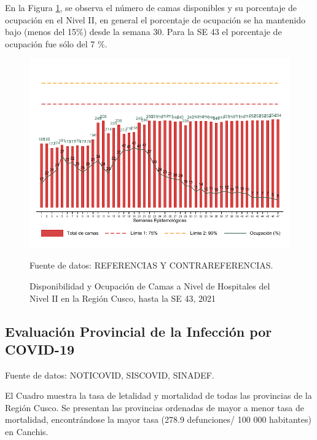 \documentclass[12pt,a4paper,openany]{book}
\begin{document}
En la Figura \ref{fig:ocupacion_2nivel}, se observa el número de camas disponibles y su porcentaje de ocupación en el Nivel II, en general el porcentaje de ocupación se ha mantenido bajo (menos del 15$\%$) desde la semana 30. Para la SE 43 el porcentaje de ocupación fue sólo del 7 $\%$. 

\begin{figure}[h]
	\caption{Disponibilidad y Ocupación de Camas a Nivel de Hospitales del Nivel II en la Región Cusco, hasta la SE 43, 2021}\label{fig:ocupacion_2nivel}
	\begin{center}
		\includegraphics[width=0.85\linewidth]{../figuras/nivel_2.pdf}
	\end{center}
	{\footnotesize {Fuente de datos: REFERENCIAS Y CONTRAREFERENCIAS.}}
\end{figure}
\clearpage
\begin{landscape}
	
	\subsection*{Evaluación Provincial de la Infección por COVID-19} 
	
	
	{\footnotesize Fuente de datos: NOTICOVID, SISCOVID, SINADEF.}
	
	\noindent El Cuadro muestra la tasa de letalidad y mortalidad de todas las provincias de la Región Cusco. Se presentan las provincias ordenadas de mayor a menor tasa de mortalidad, encontrándose la mayor tasa (278.9 defunciones/ 100 000 habitantes) en Canchis. 
	
\end{landscape}
\end{document}
